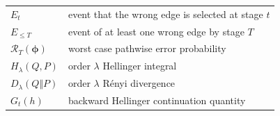 \documentclass[11pt]{article}
\begin{document}
\begin{center}
\begin{tabular}{@{}ll@{}}
$E_t$ & event that the wrong edge is selected at stage $t$ \\
$E_{\le T}$ & event of at least one wrong edge by stage $T$ \\
$\mathcal{R}_T(\boldsymbol{\phi})$ & worst case pathwise error probability \\
$H_{\lambda}(Q,P)$ & order $\lambda$ Hellinger integral \\
$D_{\lambda}(Q\Vert P)$ & order $\lambda$ R\'enyi divergence \\
$G_t(h)$ & backward Hellinger continuation quantity \\
\bottomrule
\end{tabular}
\end{center}
\end{document}
